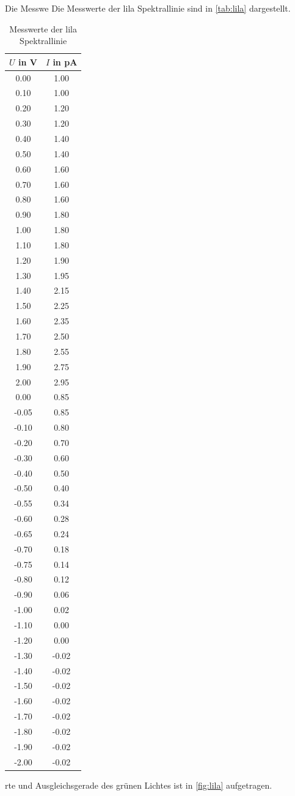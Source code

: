 Die Messwe
Die Messwerte der lila Spektrallinie sind in \autoref{tab:lila} dargestellt.
\begin{table}
    \centering 
    \caption{Messwerte der lila Spektrallinie}
\begin{tabular}{c c}
    \toprule
    $U$ in V&$I$ in pA \\
    \midrule
    0.00 & 1.00 \\
     0.10 & 1.00 \\
     0.20 & 1.20 \\
     0.30 & 1.20 \\
     0.40 & 1.40 \\
     0.50 & 1.40 \\
     0.60 & 1.60 \\
     0.70 & 1.60 \\
     0.80 & 1.60 \\
     0.90 & 1.80 \\
     1.00 & 1.80 \\
     1.10 & 1.80 \\
     1.20 & 1.90 \\
     1.30 & 1.95 \\
     1.40 & 2.15 \\
     1.50 & 2.25 \\
     1.60 & 2.35 \\
     1.70 & 2.50 \\
     1.80 & 2.55 \\
     1.90 & 2.75 \\
     2.00 & 2.95 \\
     0.00 & 0.85 \\
    -0.05 & 0.85 \\
    -0.10 & 0.80 \\
    -0.20 & 0.70 \\
    -0.30 & 0.60 \\
    -0.40 & 0.50 \\
    -0.50 & 0.40 \\
    -0.55 & 0.34 \\
    -0.60 & 0.28 \\
    -0.65 & 0.24 \\
    -0.70 & 0.18 \\
    -0.75 & 0.14 \\
    -0.80 & 0.12 \\
    -0.90 & 0.06 \\
    -1.00 & 0.02 \\
    -1.10 & 0.00 \\
    -1.20 & 0.00 \\
   -1.30 & -0.02 \\
   -1.40 & -0.02 \\
   -1.50 & -0.02 \\
   -1.60 & -0.02 \\
   -1.70 & -0.02 \\
   -1.80 & -0.02 \\
   -1.90 & -0.02 \\
   -2.00 & -0.02 \\
    \bottomrule
    \end{tabular}
    \label{tab:lila}
\end{table}rte und Ausgleichsgerade des grünen Lichtes ist in \autoref{fig:lila} aufgetragen.
